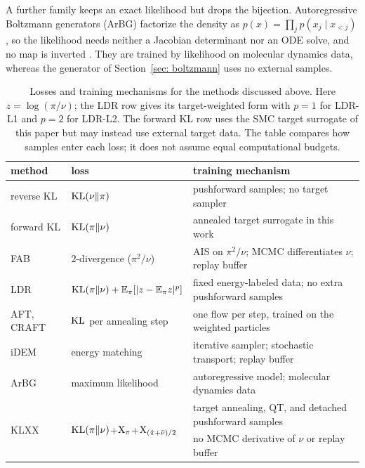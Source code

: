 \documentclass{article}
\begin{document}
A further family keeps an exact likelihood but drops the bijection. Autoregressive Boltzmann generators (ArBG) factorize the density as $p(x)=\prod_j p(x_j\mid x_{<j})$, so the likelihood needs neither a Jacobian determinant nor an ODE solve, and no map is inverted \citep{rehman2026autoregressive}. They are trained by likelihood on molecular dynamics data, whereas the generator of Section~\ref{sec: boltzmann} uses no external samples.

\begin{table}[htb]
\centering
{\small
\begin{tabular}{@{}lll@{}}
\toprule
method & loss & training mechanism \\
\midrule
reverse KL & $\mathrm{KL}(\nu\|\pi)$ & pushforward samples; no target sampler \\
forward KL & $\mathrm{KL}(\pi\|\nu)$ & annealed target surrogate in this work \\
FAB & $2$-divergence ($\pi^2/\nu$) & AIS on $\pi^2/\nu$; MCMC differentiates $\nu$; replay buffer \\
LDR & $\mathrm{KL}(\pi\|\nu)+\mathbb E_\pi[|z-\mathbb E_\pi z|^p]$ & fixed energy-labeled data; no extra pushforward samples \\
AFT, CRAFT & $\mathrm{KL}$ per annealing step & one flow per step, trained on the weighted particles \\
iDEM & energy matching & iterative sampler; stochastic transport; replay buffer \\
ArBG & maximum likelihood & autoregressive model; molecular dynamics data \\
\multirow{2}{*}{KLXX} &
\multirow{2}{*}{$\mathrm{KL}(\pi\|\nu)$+$\mathrm{X}_\pi$+$\mathrm{X}_{(\hat\pi+\bar\nu)/2}$} &
target annealing, QT, and detached pushforward samples \\
& & no MCMC derivative of $\nu$ or replay buffer \\
\bottomrule
\end{tabular}
}
\caption{Losses and training mechanisms for the methods discussed above. Here $z=\log(\pi/\nu)$; the LDR row gives its target-weighted form with $p=1$ for LDR-L1 and $p=2$ for LDR-L2. The forward KL row uses the SMC target surrogate of this paper but may instead use external target data. The table compares how samples enter each loss; it does not assume equal computational budgets.}
\label{tab: loss-methods}
\end{table}
\end{document}
